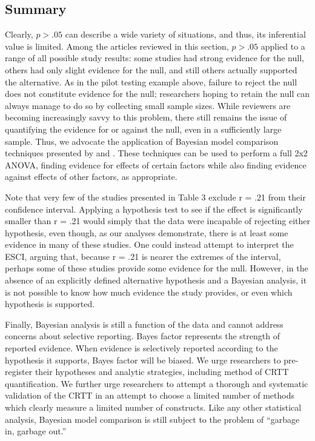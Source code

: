 \documentclass[fignum,nobf,man]{apa}
\begin{document}
\subsection{Summary}
Clearly, $p > .05$ can describe a wide variety of situations, and thus, its inferential value is limited. Among the articles reviewed in this section, $p > .05$ applied to a range of all possible study results: some studies had strong evidence for the null, others had only slight evidence for the null, and still others actually supported the alternative. As in the pilot testing example above, failure to reject the null does not constitute evidence for the null; researchers hoping to retain the null can always manage to do so by collecting small sample sizes. While reviewers are becoming increasingly savvy to this problem, there still remains the issue of quantifying the evidence for or against the null, even in a sufficiently large sample. Thus, we advocate the application of Bayesian model comparison techniques presented by \citet{Rouder:etal:2012a, Rouder:etal:2012b} %
and \citet{Dienes:2011, Dienes:2014}. %
These techniques can be used to perform a full 2x2 ANOVA, finding evidence for effects of certain factors while also finding evidence against effects of other factors, as appropriate.

Note that very few of the studies presented in Table 3 exclude r = .21 from their confidence interval. Applying a hypothesis test to see if the effect is significantly smaller than r = .21 would simply that the data were incapable of rejecting either hypothesis, even though, as our analyses demonstrate, there is at least some evidence in many of these studies. One could instead attempt to interpret the ESCI, arguing that, because r = .21 is nearer the extremes of the interval, perhaps some of these studies provide some evidence for the null. However, in the absence of an explicitly defined alternative hypothesis and a Bayesian analysis, it is not possible to know how much evidence the study provides, or even which hypothesis is supported.

Finally, Bayesian analysis is still a function of the data and cannot address concerns about selective reporting. Bayes factor represents the strength of reported evidence. When evidence is selectively reported according to the hypothesis it supports, Bayes factor will be biased. We urge researchers to pre-register their hypotheses and analytic strategies, including method of CRTT quantification. We further urge researchers to attempt a thorough and systematic validation of the CRTT in an attempt to choose a limited number of methods which clearly measure a limited number of constructs. Like any other statistical analysis, Bayesian model comparison is still subject to the problem of ``garbage in, garbage out.''
\end{document}
